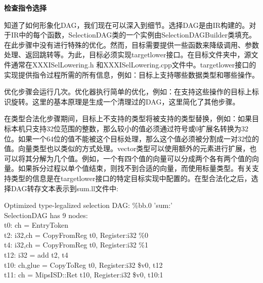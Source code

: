 \hspace*{\fill} \par %
\textbf{检查指令选择}

知道了如何形象化DAG，我们现在可以深入到细节。选择DAG是由IR构建的。对于IR中的每个函数，SelectionDAG类的一个实例由SelectionDAGBuilder类填充。在此步骤中没有进行特殊的优化。然而，目标需要提供一些函数来降级调用、参数处理、返回跳转等。为此，目标必须实现targetlower接口。在目标文件夹中，源文件通常在XXXISelLowering.h 和XXXISelLowering.cpp文件中。targetlower接口的实现提供指令过程所需的所有信息，例如：目标上支持哪些数据类型和哪些操作。\par

优化步骤会运行几次。优化器执行简单的优化，例如：在支持这些操作的目标上标识旋转。这里的基本原理是生成一个清理过的DAG，这里简化了其他步骤。\par

在类型合法化步骤期间，目标上不支持的类型将被支持的类型替换，例如：如果目标本机只支持32位范围的整数，那么较小的值必须通过符号或0扩展名转换为32位。如果一个64位的值不能被这个目标处理，那么这个值必须被分割成一对32位的值。向量类型也以类似的方式处理。vector类型可以使用额外的元素进行扩展，也可以将其分解为几个值。例如，一个有四个值的向量可以分成两个各有两个值的向量。如果拆分过程以单个值结束，则找不到合适的向量，而使用标量类型。有关支持类型的信息是在targetlower接口的特定目标实现中配置的。在型合法化之后，选择DAG转存文本表示到sum.ll文件中:\par

\begin{tcolorbox}[colback=white,colframe=black]
Optimized type-legalized selection DAG: \%bb.0 'sum:' \\
SelectionDAG has 9 nodes: \\
\hspace*{0.5cm}t0: ch = EntryToken \\
\hspace*{1.5cm}t2: i32,ch = CopyFromReg t0, Register:i32 \%0 \\
\hspace*{1.5cm}t4: i32,ch = CopyFromReg t0, Register:i32 \%1 \\
\hspace*{1cm}t12: i32 = add t2, t4 \\
\hspace*{0.5cm}t10: ch,glue = CopyToReg t0, Register:i32 \$v0, t12 \\
\hspace*{0.5cm}t11: ch = MipsISD::Ret t10, Register:i32 \$v0, t10:1
\end{tcolorbox}

